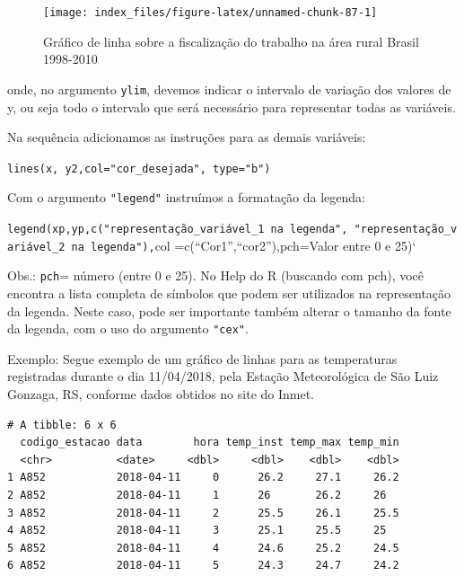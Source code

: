 \documentclass[12pt,brazil,oneside]{book}
\newenvironment{Shaded}{\begin{snugshade}}{\end{snugshade}}
\newcommand{\DataTypeTok}[1]{\textcolor[rgb]{0.13,0.29,0.53}{#1}}
\newcommand{\KeywordTok}[1]{\textcolor[rgb]{0.13,0.29,0.53}{\textbf{#1}}}
\newcommand{\NormalTok}[1]{#1}
\newcommand{\OtherTok}[1]{\textcolor[rgb]{0.56,0.35,0.01}{#1}}
\newcommand{\StringTok}[1]{\textcolor[rgb]{0.31,0.60,0.02}{#1}}
\begin{document}
\begin{figure}[H]

{\centering \texttt{[image: index\_files/figure-latex/unnamed-chunk-87-1]} 

}

\caption{Gráfico de linha sobre a fiscalização do trabalho na área rural Brasil 1998-2010}\label{fig:unnamed-chunk-87}
\end{figure}

onde, no argumento \texttt{ylim}, devemos indicar o intervalo de variação dos valores de y, ou seja todo o intervalo que será necessário para representar todas as variáveis.

Na sequência adicionamos as instruções para as demais variáveis:

\texttt{lines(x,\ y2,col="cor\_desejada",\ type="b")}

Com o argumento \texttt{"legend"} instruímos a formatação da legenda:

\texttt{legend(xp,yp,c("representação\_variável\_1\ na\ legenda",\ "representação\_variável\_2\ na\ legenda"),}col =c(``Cor1'',``cor2''),pch=Valor entre 0 e 25)`

Obs.: \texttt{pch}= número (entre 0 e 25). No Help do R (buscando com pch), você encontra a lista completa de símbolos que podem ser utilizados na representação da legenda.
Neste caso, pode ser importante também alterar o tamanho da fonte da legenda, com o uso do argumento \texttt{"cex"}.

Exemplo: Segue exemplo de um gráfico de linhas para as temperaturas registradas durante o dia 11/04/2018, pela Estação Meteorológica de São Luiz Gonzaga, RS, conforme dados obtidos no site do Inmet.

\begin{Shaded}
\end{Shaded}

\begin{verbatim}
# A tibble: 6 x 6
  codigo_estacao data        hora temp_inst temp_max temp_min
  <chr>          <date>     <dbl>     <dbl>    <dbl>    <dbl>
1 A852           2018-04-11     0      26.2     27.1     26.2
2 A852           2018-04-11     1      26       26.2     26  
3 A852           2018-04-11     2      25.5     26.1     25.5
4 A852           2018-04-11     3      25.1     25.5     25  
5 A852           2018-04-11     4      24.6     25.2     24.5
6 A852           2018-04-11     5      24.3     24.7     24.2
\end{verbatim}
\end{document}
